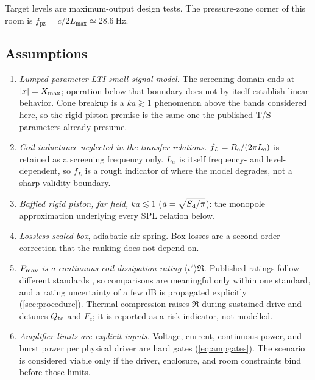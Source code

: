 Target levels are maximum-output design tests. The pressure-zone corner of
this room is $f_{\mathrm{pz}}=c/2L_{\max}\simeq\SI{28.6}{\hertz}$.

\subsection{Assumptions}
\label{sec:scope-assumptions}

\begin{enumerate}
\item[A1.] \emph{Lumped-parameter LTI small-signal model.} The screening
	domain ends at $|x|=X_{\mathrm{max}}$; operation below that boundary does not by
	itself establish linear behavior. Cone breakup is a $ka\gtrsim1$
	phenomenon above the bands considered here, so the rigid-piston premise
	is the same one the published T/S parameters already presume.

\item[A2.] \emph{Coil inductance neglected in the transfer relations.}
	$f_L=R_{\mathrm{e}}/(2\pi L_{\mathrm{e}})$ is retained as a screening frequency only. $L_{\mathrm{e}}$ is
	itself frequency- and level-dependent, so $f_L$ is a rough indicator of
	where the model degrades, not a sharp validity boundary.

\item[A3.] \emph{Baffled rigid piston, far field, $ka\lesssim1$}
	($a=\sqrt{S_{\mathrm{d}}/\pi}$): the monopole approximation underlying every SPL
	relation below.

\item[A4.] \emph{Lossless sealed box}, adiabatic air spring. Box losses are
	a second-order correction that the ranking does not depend on.

\item[A5.] \emph{$P_{\mathrm{max}}$ is a continuous coil-dissipation rating}
	$\langle i^2\rangle\Re$. Published ratings follow different standards
	\cite{aes2}, so comparisons are meaningful only within one standard, and
	a rating uncertainty of a few dB is propagated explicitly
	(\cref{sec:procedure}). Thermal compression \cite{button1992} raises
	$\Re$ during sustained drive and detunes $Q_{\mathrm{tc}}$ and $F_c$; it is
	reported as a risk indicator, not modelled.

\item[A6.] \emph{Amplifier limits are explicit inputs.} Voltage, current,
	continuous power, and burst power per physical driver are hard gates
	(\cref{eq:ampgates}). The scenario is considered viable only if the
	driver, enclosure, and room constraints bind before those limits.


\end{enumerate}
